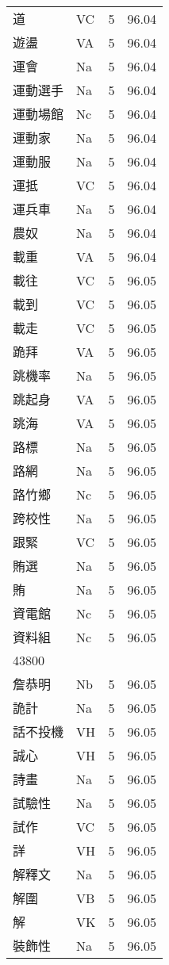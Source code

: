 \documentclass[twocolumn]{book}
\begin{document}
\begin{supertabular}{llrr}
道 & VC & 5 &  96.04\\
遊盪 & VA & 5 &  96.04\\
運會 & Na & 5 &  96.04\\
運動選手 & Na & 5 &  96.04\\
運動場館 & Nc & 5 &  96.04\\
運動家 & Na & 5 &  96.04\\
運動服 & Na & 5 &  96.04\\
運抵 & VC & 5 &  96.04\\
運兵車 & Na & 5 &  96.04\\
農奴 & Na & 5 &  96.04\\
載重 & VA & 5 &  96.04\\
載往 & VC & 5 &  96.05\\
載到 & VC & 5 &  96.05\\
載走 & VC & 5 &  96.05\\
跪拜 & VA & 5 &  96.05\\
跳機率 & Na & 5 &  96.05\\
跳起身 & VA & 5 &  96.05\\
跳海 & VA & 5 &  96.05\\
路標 & Na & 5 &  96.05\\
路網 & Na & 5 &  96.05\\
路竹鄉 & Nc & 5 &  96.05\\
跨校性 & Na & 5 &  96.05\\
跟緊 & VC & 5 &  96.05\\
賄選 & Na & 5 &  96.05\\
賄 & Na & 5 &  96.05\\
資電館 & Nc & 5 &  96.05\\
資料組 & Nc & 5 &  96.05\\
43800\\
詹恭明 & Nb & 5 &  96.05\\
詭計 & Na & 5 &  96.05\\
話不投機 & VH & 5 &  96.05\\
誠心 & VH & 5 &  96.05\\
詩畫 & Na & 5 &  96.05\\
試驗性 & Na & 5 &  96.05\\
試作 & VC & 5 &  96.05\\
詳 & VH & 5 &  96.05\\
解釋文 & Na & 5 &  96.05\\
解圍 & VB & 5 &  96.05\\
解 & VK & 5 &  96.05\\
裝飾性 & Na & 5 &  96.05\\

\end{supertabular}
\end{document}
